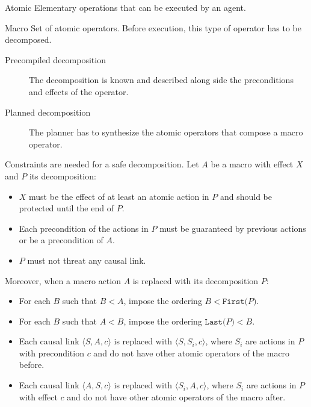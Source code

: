 \begin{descriptionlist}
    \item[Atomic] Elementary operations that can be executed by an agent.
    \item[Macro] Set of atomic operators. Before execution, this type of operator has to be decomposed.
        \begin{description}
            \item[Precompiled decomposition] 
                The decomposition is known and described along side the preconditions and effects of the operator.
            \item[Planned decomposition] 
                The planner has to synthesize the atomic operators that compose a macro operator.
        \end{description}

        Constraints are needed for a safe decomposition.
        Let $A$ be a macro with effect $X$ and $P$ its decomposition:
        \begin{itemize}
            \item $X$ must be the effect of at least an atomic action in $P$ and should be protected until the end of $P$.
            \item Each precondition of the actions in $P$ must be guaranteed by previous actions or be a precondition of $A$.
            \item $P$ must not threat any causal link.
        \end{itemize}

        Moreover, when a macro action $A$ is replaced with its decomposition $P$:
        \begin{itemize}
            \item For each $B$ such that $B < A$, impose the ordering $B < \texttt{First($P$)}$.
            \item For each $B$ such that $A < B$, impose the ordering $\texttt{Last($P$)} < B$.
            \item Each causal link $\langle S, A, c \rangle$ is replaced with $\langle S, S_i, c \rangle$,
                where $S_i$ are actions in $P$ with precondition $c$ and do not have other atomic operators of the macro before.
            \item Each causal link $\langle A, S, c \rangle$ is replaced with $\langle S_i, A, c \rangle$,
                where $S_i$ are actions in $P$ with effect $c$ and do not have other atomic operators of the macro after.
        \end{itemize}
        
\end{descriptionlist}

